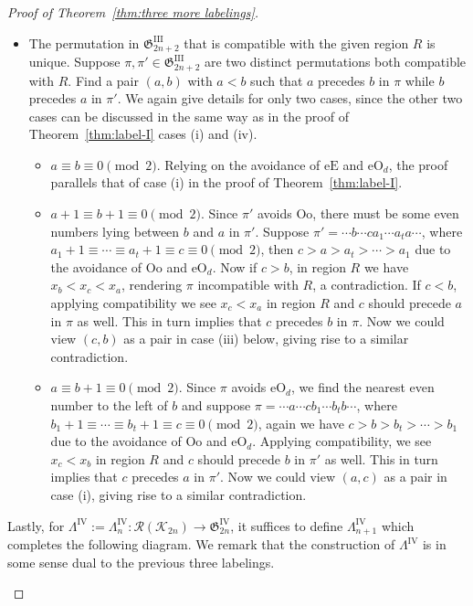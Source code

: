 \documentclass[11pt,reqno]{amsart}
\numberwithin{equation}{section}
\theoremstyle{plain}
\theoremstyle{definition}
\newcommand{\fG}{\mathfrak{G}}
\newcommand{\cK}{\mathcal{K}}
\newcommand{\cR}{\mathcal{R}}
\newcommand{\GIII}{\fG^{\mathrm{III}}}
\newcommand{\GIV}{\fG^{\mathrm{IV}}}
\newcommand{\LIV}{\Lambda^{\mathrm{IV}}}
\def\eE{\mathrm{eE}}
\def\eO{\mathrm{eO}}
\def\Oo{\mathrm{Oo}}
\begin{document}
\begin{proof}[Proof of Theorem~\ref{thm:three more labelings}]
\begin{itemize}
    	\item The permutation in $\GIII_{2n+2}$ that is compatible with the given region $R$ is unique. Suppose $\pi,\pi'\in\GIII_{2n+2}$ are two distinct permutations both compatible with $R$. Find a pair $(a,b)$ with $a<b$ such that $a$ precedes $b$ in $\pi$ while $b$ precedes $a$ in $\pi'$. We again give details for only two cases, since the other two cases can be discussed in the same way as in the proof of Theorem~\ref{thm:label-I} cases (i) and (iv).
    	\begin{itemize}
    		\item[(i)] $a\equiv b\equiv 0\pmod 2$. Relying on the avoidance of $\eE$ and $\eO_d$, the proof parallels that of case (i) in the proof of Theorem~\ref{thm:label-I}.
    		\item[(ii)] $a+1\equiv b+1\equiv 0\pmod 2$. Since $\pi'$ avoids $\Oo$, there must be some even numbers lying between $b$ and $a$ in $\pi'$. Suppose $\pi'=\cdots b\cdots ca_1\cdots a_ta\cdots$, where $a_1+1\equiv\cdots\equiv a_t+1\equiv c\equiv 0\pmod 2$, then $c>a>a_t>\cdots>a_1$ due to the avoidance of $\Oo$ and $\eO_d$. Now if $c>b$, in region $R$ we have $x_b<x_c<x_a$, rendering $\pi$ incompatible with $R$, a contradiction. If $c<b$, applying compatibility we see $x_c<x_a$ in region $R$ and $c$ should precede $a$ in $\pi$ as well. This in turn implies that $c$ precedes $b$ in $\pi$. Now we could view $(c,b)$ as a pair in case (iii) below, giving rise to a similar contradiction.
    		\item[(iii)] $a\equiv b+1\equiv 0\pmod 2$. Since $\pi$ avoids $\eO_d$, we find the nearest even number to the left of $b$ and suppose $\pi=\cdots a\cdots cb_1\cdots b_tb\cdots$, where $b_1+1\equiv\cdots\equiv b_t+1\equiv c\equiv 0\pmod 2$, again we have $c>b>b_t>\cdots>b_1$ due to the avoidance of $\Oo$ and $\eO_d$. Applying compatibility, we see $x_c<x_b$ in region $R$ and $c$ should precede $b$ in $\pi'$ as well. This in turn implies that $c$ precedes $a$ in $\pi'$. Now we could view $(a,c)$ as a pair in case (i), giving rise to a similar contradiction.
    	\end{itemize}
    \end{itemize}
    
    Lastly, for $\LIV:=\LIV_n: \cR(\cK_{2n}) \to \GIV_{2n}$, it suffices to define $\LIV_{n+1}$ which completes the following diagram. We remark that the construction of $\LIV$ is in some sense dual to the previous three labelings.
    
    \begin{figure}[h!]
    	\begin{tikzpicture}[scale=0.8]
    		

\end{tikzpicture}
\end{figure}
\end{proof}
\end{document}
